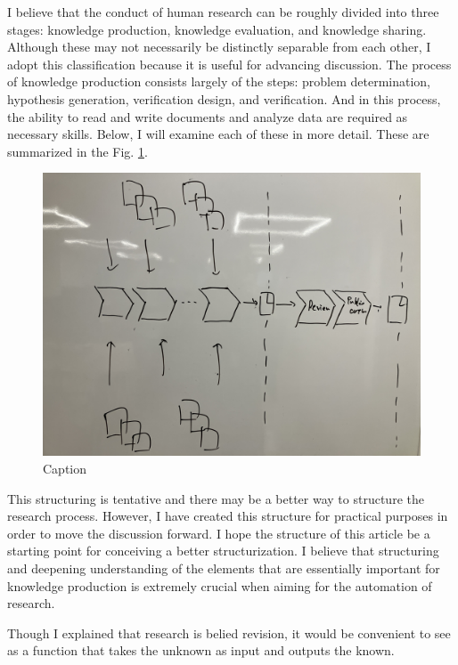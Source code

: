 \documentclass{book}
\begin{document}
I believe that the conduct of human research can be roughly divided into three stages: knowledge production, knowledge evaluation, and knowledge sharing. Although these may not necessarily be distinctly separable from each other, I adopt this classification because it is useful for advancing discussion. The process of knowledge production consists largely of the steps: problem determination, hypothesis generation, verification design, and verification. And in this process, the ability to read and write documents and analyze data are required as necessary skills. Below, I will examine each of these in more detail. These are summarized in the Fig. \ref{fig:research_process}.

\begin{figure}[htb]
    \centering
    \includegraphics[width=\textwidth]{figs/researchprocess.jpg}
    \caption{Caption}
    \label{fig:research_process}
\end{figure}


This structuring is tentative and there may be a better way to structure the research process. However, I have created this structure for practical purposes in order to move the discussion forward. I hope the structure of this article be a starting point for conceiving a better structurization. I believe that structuring and deepening understanding of the elements that are essentially important for knowledge production is extremely crucial when aiming for the automation of research.

Though I explained that research is belied revision, it would be convenient to see as a function that takes the unknown as input and outputs the known.  %
\end{document}
